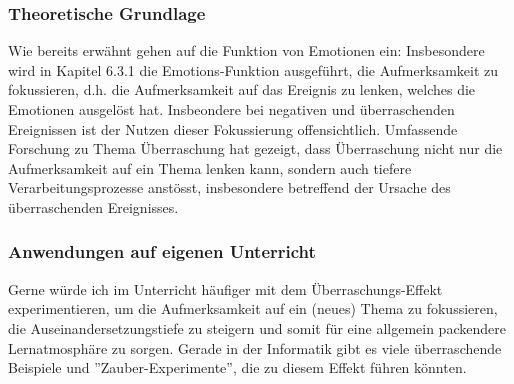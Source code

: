 \begin{myExBox}[title=Emotionen zur Fokussierung von Aufmerksamkeit]
\subsubsection*{Theoretische Grundlage}
Wie bereits erwähnt gehen \textcite{alma99116838938605511} auf die Funktion von Emotionen ein: Insbesondere wird in Kapitel 6.3.1 die Emotions-Funktion ausgeführt, die Aufmerksamkeit zu fokussieren, d.h. die Aufmerksamkeit auf das Ereignis zu lenken, welches die Emotionen ausgelöst hat. Insbeondere bei negativen und überraschenden Ereignissen ist der Nutzen dieser Fokussierung offensichtlich. Umfassende Forschung zu Thema Überraschung hat gezeigt, dass Überraschung nicht nur die Aufmerksamkeit auf ein Thema lenken kann, sondern auch tiefere Verarbeitungsprozesse anstösst, insbesondere betreffend der Ursache des überraschenden Ereignisses.

\subsubsection*{Anwendungen auf eigenen Unterricht}
Gerne würde ich im Unterricht häufiger mit dem Überraschungs-Effekt experimentieren, um die Aufmerksamkeit auf ein (neues) Thema zu fokussieren, die Auseinandersetzungstiefe zu steigern und somit für eine allgemein packendere Lernatmosphäre zu sorgen. Gerade in der Informatik gibt es viele überraschende Beispiele und ''Zauber-Experimente'', die zu diesem Effekt führen könnten.
\end{myExBox}

